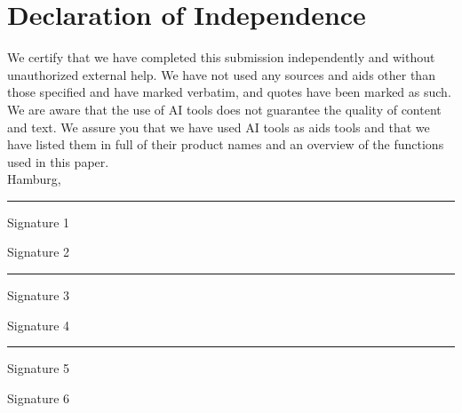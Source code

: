\section*{Declaration of Independence}

We certify that we have completed this submission independently and without unauthorized external help. We have not used any sources and aids other than those specified and have marked verbatim, and quotes have been marked as such. We are aware that the use of AI tools does not guarantee the quality of content and text. We assure you that we have used AI tools as aids tools and that we have listed them in full of their product names and an overview of the functions used in this paper.\\

Hamburg, \dateofsubmission\\

\vspace{2cm}

\hrule
\vspace{3mm}

\begin{minipage}[H]{0.49\textwidth}
	Signature 1
\end{minipage}
\begin{minipage}[H]{0.49\textwidth}
	Signature 2
\end{minipage}

\vspace{2cm}

\hrule
\vspace{3mm}

\begin{minipage}[H]{0.49\textwidth}
	Signature 3
\end{minipage}
\begin{minipage}[H]{0.49\textwidth}
	Signature 4
\end{minipage}

\vspace{2cm}

\hrule
\vspace{3mm}

\begin{minipage}[H]{0.49\textwidth}
	Signature 5
\end{minipage}
\begin{minipage}[H]{0.49\textwidth}
	Signature 6
\end{minipage}